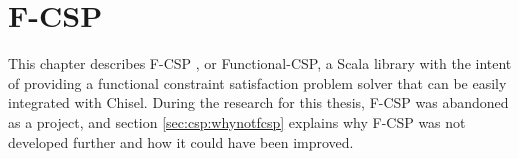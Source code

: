 



\chapter{F-CSP}\label{fcsp}
This chapter describes F-CSP \cite{github:f-csp}, or Functional-CSP, a Scala
library with the intent of providing a functional constraint satisfaction
problem solver that can be easily integrated with Chisel. During the research
for this thesis, F-CSP was abandoned as a project, and section
\ref{sec:csp:whynotfcsp} explains why F-CSP was not developed further and how it
could have been improved.

